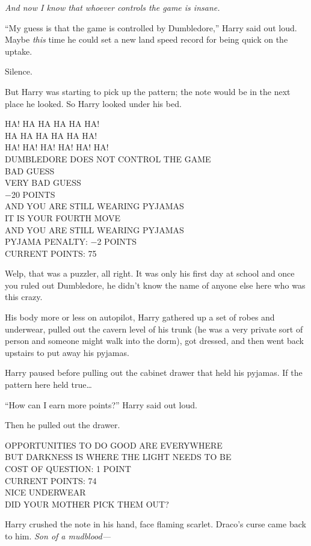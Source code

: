 \emph{And now I know that whoever controls the game is insane.}

``My guess is that the game is controlled by Dumbledore,'' Harry said
out loud. Maybe \emph{this} time he could set a new land speed record
for being quick on the uptake.

Silence.

But Harry was starting to pick up the pattern; the note would be in the
next place he looked. So Harry looked under his bed.

HA! HA HA HA HA HA!\\HA HA HA HA HA HA!\\HA! HA! HA! HA! HA!
HA!\\DUMBLEDORE DOES NOT CONTROL THE GAME\\BAD GUESS\\VERY BAD
GUESS\\−20 POINTS\\AND YOU ARE STILL WEARING PYJAMAS\\IT IS YOUR FOURTH
MOVE\\AND YOU ARE STILL WEARING PYJAMAS\\PYJAMA PENALTY: −2
POINTS\\CURRENT POINTS: 75

Welp, that was a puzzler, all right. It was only his first day at school
and once you ruled out Dumbledore, he didn't know the name of anyone
else here who was this crazy.

His body more or less on autopilot, Harry gathered up a set of robes and
underwear, pulled out the cavern level of his trunk (he was a very
private sort of person and someone might walk into the dorm), got
dressed, and then went back upstairs to put away his pyjamas.

Harry paused before pulling out the cabinet drawer that held his
pyjamas. If the pattern here held true\ldots{}

``How can I earn more points?'' Harry said out loud.

Then he pulled out the drawer.

OPPORTUNITIES TO DO GOOD ARE EVERYWHERE\\BUT DARKNESS IS WHERE THE LIGHT
NEEDS TO BE\\COST OF QUESTION: 1 POINT\\CURRENT POINTS: 74\\NICE
UNDERWEAR\\DID YOUR MOTHER PICK THEM OUT?

Harry crushed the note in his hand, face flaming scarlet. Draco's curse
came back to him. \emph{Son of a mudblood---}

